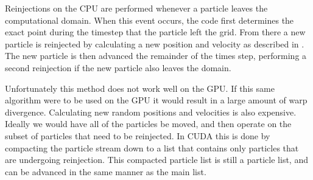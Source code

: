 Reinjections on the CPU are performed whenever a particle leaves the computational domain. When this event occurs, the code first determines the exact point during the timestep that the particle left the grid. From there a new particle is reinjected by calculating a new position and velocity as described in \cite{Patacchini2007}. The new particle is then advanced the remainder of the times step, performing a second reinjection if the new particle also leaves the domain. 

Unfortunately this method does not work well on the GPU. If this same algorithm were to be used on the GPU it would result in a large amount of warp divergence. Calculating new random positions and velocities is also expensive. Ideally we would have all of the particles be moved, and then operate on the subset of particles that need to be reinjected. In CUDA this is done by compacting the particle stream down to a list that contains only particles that are undergoing reinjection. This compacted particle list is still a particle list, and can be advanced in the same manner as the main list.  





